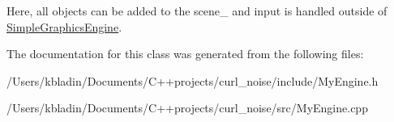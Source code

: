 Here, all objects can be added to the scene\-\_\- and input is handled outside of \hyperlink{class_simple_graphics_engine}{Simple\-Graphics\-Engine}. 

The documentation for this class was generated from the following files\-:\begin{DoxyCompactItemize}
\item 
/\-Users/kbladin/\-Documents/\-C++projects/curl\-\_\-noise/include/My\-Engine.\-h\item 
/\-Users/kbladin/\-Documents/\-C++projects/curl\-\_\-noise/src/My\-Engine.\-cpp\end{DoxyCompactItemize}
